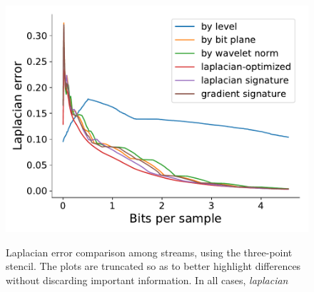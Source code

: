 \begin{figure}[h]
	{\includegraphics[width=0.48\linewidth]{img/laplacian/laplacian-optimized-velocityz.pdf}}
	\caption{Laplacian error comparison among streams, using the three-point stencil. The plots are
	truncated so as to better highlight differences without discarding important information. In all cases, \emph{laplacian}}
	\label{fig:laplacian-error-comparison}
\end{figure}

